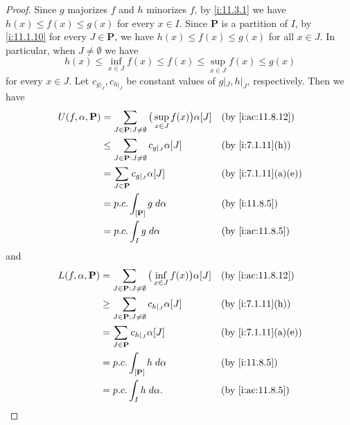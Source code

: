 \begin{proof}
  Since \(g\) majorizes \(f\) and \(h\) minorizes \(f\), by \cref{i:11.3.1} we have \(h(x) \leq f(x) \leq g(x)\) for every \(x \in I\).
  Since \(\mathbf{P}\) is a partition of \(I\), by \cref{i:11.1.10} for every \(J \in \mathbf{P}\), we have \(h(x) \leq f(x) \leq g(x)\) for all \(x \in J\).
  In particular, when \(J \neq \emptyset\) we have
  \[
    h(x) \leq \inf_{x \in J} f(x) \leq f(x) \leq \sup_{x \in J} f(x) \leq g(x)
  \]
  for every \(x \in J\).
  Let \(c_{g|_J}, c_{h|_J}\) be constant values of \(g|_J, h|_J\), respectively.
  Then we have
  \begin{align*}
    U(f, \alpha, \mathbf{P}) & = \sum_{J \in \mathbf{P} : J \neq \emptyset} \big(\sup_{x \in J} f(x)\big) \alpha[J] &  & \by{i:ac:11.8.12}  \\
                             & \leq \sum_{J \in \mathbf{P} : J \neq \emptyset} c_{g|_J} \alpha[J]                   &  & \by{i:7.1.11}[h]   \\
                             & = \sum_{J \in \mathbf{P}} c_{g|_J} \alpha[J]                                         &  & \by{i:7.1.11}[a,e] \\
                             & = p.c. \int_{[\mathbf{P}]} g \; d \alpha                                             &  & \by{i:11.8.5}      \\
                             & = p.c. \int_I g \; d \alpha                                                          &  & \by{i:ac:11.8.5}
  \end{align*}
  and
  \begin{align*}
    L(f, \alpha, \mathbf{P}) & = \sum_{J \in \mathbf{P} : J \neq \emptyset} \big(\inf_{x \in J} f(x)\big) \alpha[J] &  & \by{i:ac:11.8.12}  \\
                             & \geq \sum_{J \in \mathbf{P} : J \neq \emptyset} c_{h|_J} \alpha[J]                   &  & \by{i:7.1.11}[h]   \\
                             & = \sum_{J \in \mathbf{P}} c_{h|_J} \alpha[J]                                         &  & \by{i:7.1.11}[a,e] \\
                             & = p.c. \int_{[\mathbf{P}]} h \; d \alpha                                             &  & \by{i:11.8.5}      \\
                             & = p.c. \int_I h \; d \alpha.                                                         &  & \by{i:ac:11.8.5}
  \end{align*}
\end{proof}

